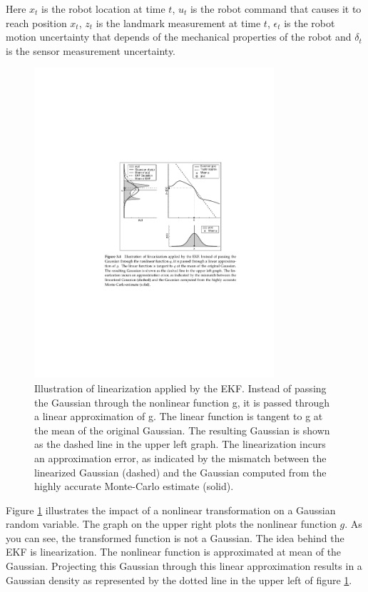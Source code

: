 \documentclass[conference]{IEEEtran}
\begin{document}
Here $x_{t}$ is the robot location at time $t$, $u_{t}$ is the robot command that causes it to reach position $x_{t}$, $z_{t}$ is the landmark measurement at time $t$, $\epsilon_{t}$ is the robot motion uncertainty that depends of the mechanical properties of the robot and $\delta_{t}$ is the sensor measurement uncertainty. \\

\begin{figure}[!t]
\centering
\includegraphics[width=3.5in]{./figures/EkfXform.pdf}
\caption{Illustration of linearization applied by the EKF. Instead of passing the Gaussian through the nonlinear function g, it is passed through a linear approximation of g. The linear function is tangent to g at the mean of the original Gaussian. The resulting Gaussian is shown as the dashed line in the upper left graph. The linearization incurs an approximation error, as indicated by the mismatch between the linearized Gaussian (dashed) and the Gaussian computed from the highly accurate Monte-Carlo estimate (solid).}
\label{EkfXform}
\end{figure}

Figure \ref{EkfXform} illustrates the impact of a nonlinear transformation on a Gaussian random variable. The graph on the upper right plots the nonlinear function $g$. As you can see, the transformed function is not a Gaussian. The idea behind the EKF is linearization. The nonlinear function is approximated at mean of the Gaussian. Projecting this Gaussian through this linear approximation results in a Gaussian density as represented by the dotted line in the upper left of figure \ref{EkfXform}.
\end{document}
